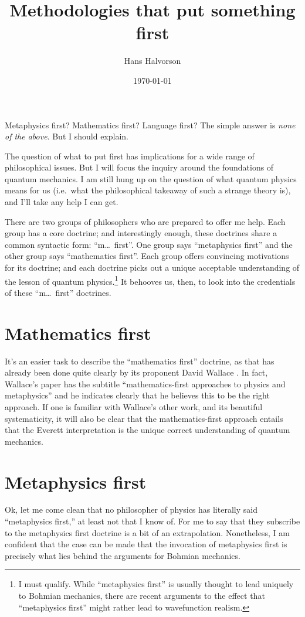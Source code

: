 \documentclass[12pt]{article}
\title{Methodologies that put something first}
\author{Hans Halvorson}
\date{\today}
\begin{document}
\maketitle

Metaphysics first? Mathematics first? Language first? The simple
answer is \emph{none of the above}. But I should explain.

The question of what to put first has implications for a wide range of
philosophical issues. But I will focus the inquiry around the
foundations of quantum mechanics. I am still hung up on the question
of what quantum physics means for us (i.e.\ what the philosophical
takeaway of such a strange theory is), and I'll take any help I can
get.

There are two groups of philosophers who are prepared to offer me
help. Each group has a core doctrine; and interestingly enough, these
doctrines share a common syntactic form: ``m\dots\ first''. One group
says ``metaphysics first'' and the other group says ``mathematics
first''. Each group offers convincing motivations for its doctrine;
and each doctrine picks out a unique acceptable understanding of the
lesson of quantum physics.\footnote{I must qualify. While
  ``metaphysics first'' is usually thought to lead uniquely to Bohmian
  mechanics, there are recent arguments to the effect that
  ``metaphysics first'' might rather lead to wavefunction realism.} It
behooves us, then, to look into the credentials of these ``m\dots\
first'' doctrines.

\section{Mathematics first}

It's an easier task to describe the ``mathematics first'' doctrine, as
that has already been done quite clearly by its proponent David
Wallace \citep{wallace2022}. In fact, Wallace's paper has the subtitle
``mathematics-first approaches to physics and metaphysics'' and he
indicates clearly that he believes this to be the right approach. If
one is familiar with Wallace's other work, and its beautiful
systematicity, it will also be clear that the mathematics-first
approach entails that the Everett interpretation is the unique correct
understanding of quantum mechanics.

\section{Metaphysics first}



Ok, let me come clean that no philosopher of physics has literally
said ``metaphysics first,'' at least not that I know of. For me to say
that they subscribe to the metaphysics first doctrine is a bit of an
extrapolation. Nonetheless, I am confident that the case can be made
that the invocation of metaphysics first is precisely what lies behind
the arguments for Bohmian mechanics.
\end{document}
